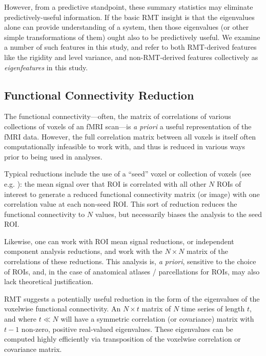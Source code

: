 \documentclass[12pt]{spieman}  %
\begin{document}
\begin{spacing}{2}
However, from a predictive standpoint, these summary statistics may eliminate
predictively-useful information. If the basic RMT insight is that the
eigenvalues alone can provide understanding of a system, then those eigenvalues
(or other simple transformations of them) ought also to be predictively useful.
We examine a number of such features in this study, and refer to both
RMT-derived features like the rigidity and level variance, and non-RMT-derived
features collectively as \textit{eigenfeatures} in this study.

\subsection{Functional Connectivity Reduction}

The functional connectivity—often, the matrix of correlations of
various collections of voxels of an fMRI scan—is \textit{a priori} a useful
representation of the fMRI data. However, the full correlation matrix between
all voxels is itself often computationally infeasible to work with, and thus is
reduced in various ways prior to being used in analyses.

Typical reductions include the use of a ``seed'' voxel or collection of voxels
(see e.g. ): the mean signal over that ROI
is correlated with all other \(N\) ROIs of interest to generate a reduced
functional connectivity matrix (or image) with one correlation value at each
non-seed ROI. This sort of reduction reduces the functional connectivity to
\(N\) values, but necessarily biases the analysis to the seed ROI.

Likewise, one can work with ROI mean signal reductions, or independent
component analysis reductions\cite{joelRelationshipSeedbasedICAbased2011,
smithCharacterizingIndividualDifferences2014}, and work with the \(N \times N\)
matrix of the correlations of these reductions. This analysis is, \textit{a
priori}, sensitive to the choice of ROIs, and, in the case of anatomical
atlases / parcellations for ROIs, may also lack theoretical justification.

RMT suggests a potentially useful reduction in the form of the eigenvalues of
the voxelwise functional connectivity. An \(N \times t\) matrix of
\(N\) time series of length \(t\), and where \(t \ll N\) will have a symmetric
correlation (or covariance) matrix with \(t - 1\) non-zero, positive
real-valued eigenvalues. These eigenvalues can be computed highly
efficiently via transposition of the voxelwise correlation or covariance
matrix.


\end{spacing}
\end{document}
